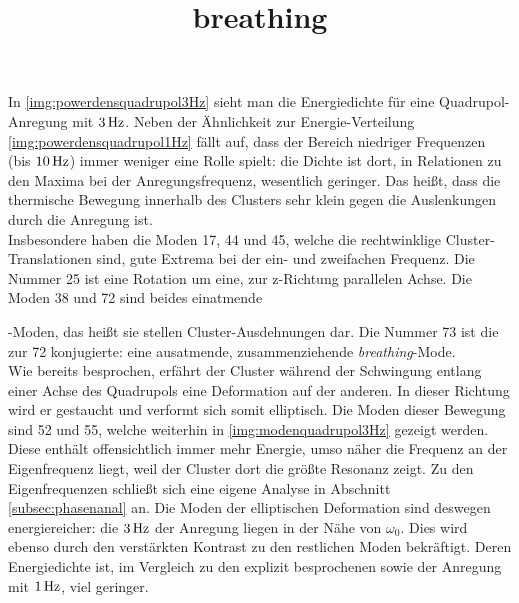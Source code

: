 \documentclass[numbers=noenddot,a4paper,notitlepage,twoside,BCOR15mm]{scrbook}
\newcommand{\ix}[1]{_\text{#1}}
\newcommand{\tilt}[1]{\textit{#1}}
\begin{document}
						In \autoref{img:powerdensquadrupol3Hz} sieht man die Energiedichte für eine Quadrupol-Anregung mit $\unit[3]{Hz}$. Neben der Ähnlichkeit zur Energie-Verteilung \autoref{img:powerdensquadrupol1Hz} fällt auf, dass der Bereich niedriger Frequenzen (bis $\unit[10]{Hz}$) immer weniger eine Rolle spielt: die Dichte ist dort, in Relationen zu den Maxima bei der Anregungsfrequenz, wesentlich geringer. Das heißt, dass die thermische Bewegung innerhalb des Clusters sehr klein gegen die Auslenkungen durch die Anregung ist.\\
						Insbesondere haben die Moden 17, 44 und 45, welche die rechtwinklige Cluster-Translationen sind, gute Extrema bei der ein- und zweifachen Frequenz. Die Nummer 25 ist eine Rotation um eine, zur z-Richtung parallelen Achse. Die Moden 38 und 72 sind beides einatmende \title{breathing}-Moden, das heißt sie stellen Cluster-Ausdehnungen dar. Die Nummer 73 ist die zur 72 konjugierte: eine ausatmende, zusammenziehende \tilt{breathing}-Mode.\\
						Wie bereits besprochen, erfährt der Cluster während der Schwingung entlang einer Achse des Quadrupols eine Deformation auf der anderen. In dieser Richtung wird er gestaucht und verformt sich somit elliptisch.  Die Moden dieser Bewegung sind 52 und 55, welche weiterhin in \autoref{img:modenquadrupol3Hz} gezeigt werden. Diese enthält offensichtlich immer mehr Energie, umso näher die Frequenz an der Eigenfrequenz liegt, weil der Cluster dort die größte Resonanz zeigt. Zu den Eigenfrequenzen schließt sich eine eigene Analyse in Abschnitt \ref{subsec:phasenanal} an. Die Moden der elliptischen Deformation sind deswegen energiereicher: die $\unit[3]{Hz}$ der Anregung liegen in der Nähe von $\omega\ix{0}$. Dies wird ebenso durch den verstärkten Kontrast zu den restlichen Moden bekräftigt. Deren Energiedichte ist, im Vergleich zu den explizit besprochenen sowie der Anregung mit $\unit[1]{Hz}$, viel geringer.
\end{document}
